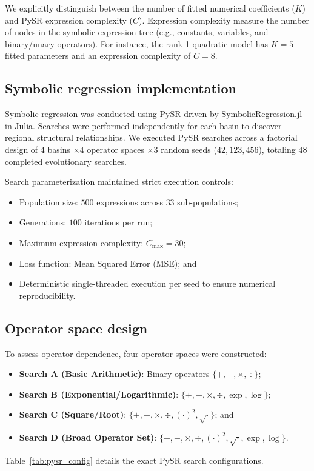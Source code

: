 We explicitly distinguish between the number of fitted numerical coefficients ($K$) and PySR expression complexity ($C$). Expression complexity measure the number of nodes in the symbolic expression tree (e.g., constants, variables, and binary/unary operators). For instance, the rank-1 quadratic model has $K=5$ fitted parameters and an expression complexity of $C=8$.

\subsection{Symbolic regression implementation}
Symbolic regression was conducted using PySR \citep{Cranmer2023} driven by SymbolicRegression.jl in Julia. Searches were performed independently for each basin to discover regional structural relationships. We executed PySR searches across a factorial design of $4$ basins $\times 4$ operator spaces $\times 3$ random seeds ($42, 123, 456$), totaling $48$ completed evolutionary searches.

Search parameterization maintained strict execution controls:
\begin{itemize}[nosep]
\item Population size: $500$ expressions across $33$ sub-populations;
\item Generations: $100$ iterations per run;
\item Maximum expression complexity: $C_{\max} = 30$;
\item Loss function: Mean Squared Error (MSE); and
\item Deterministic single-threaded execution per seed to ensure numerical reproducibility.
\end{itemize}

\subsection{Operator space design}
To assess operator dependence, four operator spaces were constructed:
\begin{itemize}[nosep]
\item \textbf{Search A (Basic Arithmetic)}: Binary operators $\{+, -, \times, \div\}$;
\item \textbf{Search B (Exponential/Logarithmic)}: $\{+, -, \times, \div, \exp, \log\}$;
\item \textbf{Search C (Square/Root)}: $\{+, -, \times, \div, (\cdot)^2, \sqrt{\cdot}\}$; and
\item \textbf{Search D (Broad Operator Set)}: $\{+, -, \times, \div, (\cdot)^2, \sqrt{\cdot}, \exp, \log\}$.
\end{itemize}
Table~\ref{tab:pysr_config} details the exact PySR search configurations.

